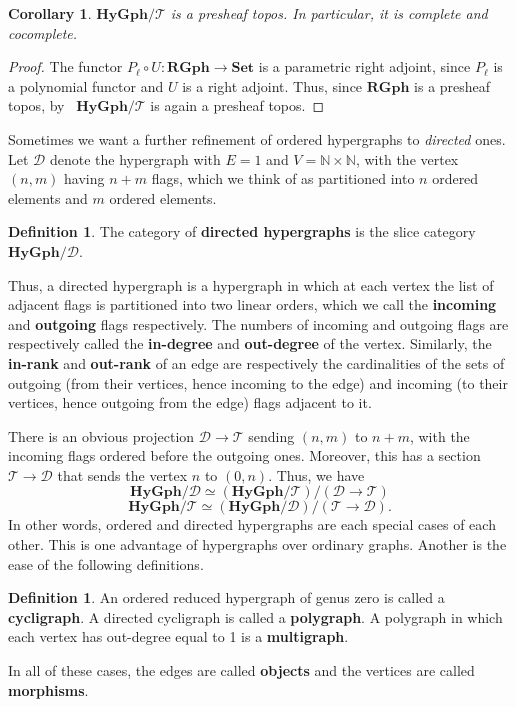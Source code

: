 \documentclass{article}
\newtheorem{cor}[thm]{Corollary}
\theoremstyle{definition}
\newtheorem{defn}[thm]{Definition}
\theoremstyle{remark}
\def\Set{\mathbf{Set}}
\def\N{\mathbb{N}}
\def\hy{\mathbf{HyGph}}
\def\RGph{\mathbf{RGph}}
\def\thy{\mathcal{T}}
\def\dhy{\mathcal{D}}
\begin{document}
\begin{cor}
  $\hy/\thy$ is a presheaf topos.
  In particular, it is complete and cocomplete.
\end{cor}
\begin{proof}
  The functor $P_\ell \circ U : \RGph \to \Set$ is a parametric right adjoint, since $P_\ell$ is a polynomial functor and $U$ is a right adjoint.
  Thus, since $\RGph$ is a presheaf topos, by~\cite{cj:clfrag} $\hy/\thy$ is again a presheaf topos.
\end{proof}

Sometimes we want a further refinement of ordered hypergraphs to \emph{directed} ones.
Let $\dhy$ denote the hypergraph with $E=1$ and $V=\N\times \N$, with the vertex $(n,m)$ having $n+m$ flags, which we think of as partitioned into $n$ ordered elements and $m$ ordered elements.

\begin{defn}
  The category of \textbf{directed hypergraphs} is the slice category $\hy/\dhy$.
\end{defn}

Thus, a directed hypergraph is a hypergraph in which at each vertex the list of adjacent flags is partitioned into two linear orders, which we call the \textbf{incoming} and \textbf{outgoing} flags respectively.
The numbers of incoming and outgoing flags are respectively called the \textbf{in-degree} and \textbf{out-degree} of the vertex.
Similarly, the \textbf{in-rank} and \textbf{out-rank} of an edge are respectively the cardinalities of the sets of outgoing (from their vertices, hence incoming to the edge) and incoming (to their vertices, hence outgoing from the edge) flags adjacent to it.

There is an obvious projection $\dhy\to\thy$ sending $(n,m)$ to $n+m$, with the incoming flags ordered before the outgoing ones.
Moreover, this has a section $\thy\to\dhy$ that sends the vertex $n$ to $(0,n)$.
Thus, we have
\[\hy/\dhy \simeq (\hy/\thy)/(\dhy\to\thy) \]
\[\hy/\thy \simeq (\hy/\dhy)/(\thy\to\dhy).\]
In other words, ordered and directed hypergraphs are each special cases of each other.
This is one advantage of hypergraphs over ordinary graphs.
Another is the ease of the following definitions.

\begin{defn}
  An ordered reduced hypergraph of genus zero is called a \textbf{cycligraph}.
  A directed cycligraph is called a \textbf{polygraph}.
  A polygraph in which each vertex has out-degree equal to 1 is a \textbf{multigraph}.

  In all of these cases, the edges are called \textbf{objects} and the vertices are called \textbf{morphisms}.
\end{defn}
\end{document}
